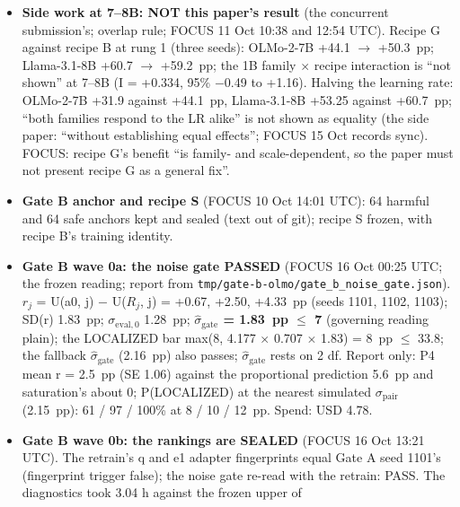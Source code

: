 \documentclass{article}
\theoremstyle{plain}
\theoremstyle{definition}
\theoremstyle{remark}
\begin{document}
\begin{itemize}
        the same sign and at least half the size, so ``harmful compliance as the
        HarmBench classifier defines it'' is allowed at 7--8B as at 1B. The same
        per-family pattern as at 1B (OLMo 1e-4, Llama 5e-5).
  \item \textbf{Side work at 7--8B: NOT this paper's result} (the concurrent
        submission's; overlap rule; FOCUS 11 Oct 10:38 and 12:54 UTC). Recipe G
        against recipe B at rung 1 (three seeds): OLMo-2-7B +44.1 $\to$
        +50.3~pp; Llama-3.1-8B +60.7 $\to$ +59.2~pp; the 1B family $\times$
        recipe interaction is ``not shown'' at 7--8B (I = +0.334, 95\% $-$0.49
        to +1.16). Halving the learning rate: OLMo-2-7B +31.9 against +44.1~pp,
        Llama-3.1-8B +53.25 against +60.7~pp; ``both families respond to the LR
        alike'' is not shown as equality (the side paper: ``without establishing
        equal effects''; FOCUS 15 Oct records sync). FOCUS: recipe G's benefit
        ``is family- and scale-dependent, so the paper must not present recipe G
        as a general fix''.
  \item \textbf{Gate B anchor and recipe S} (FOCUS 10 Oct 14:01 UTC): 64 harmful
        and 64 safe anchors kept and sealed (text out of git); recipe S frozen,
        with recipe B's training identity.
  \item \textbf{Gate B wave 0a: the noise gate PASSED} (FOCUS 16 Oct 00:25 UTC;
        the frozen reading; report from
        \nolinkurl{tmp/gate-b-olmo/gate_b_noise_gate.json}). $r_{j}$ = U(a0, j)
        $-$ U($R_{j}$, j) = +0.67, +2.50, +4.33~pp (seeds 1101, 1102, 1103);
        SD(r) 1.83~pp; $\sigma_{\mathrm{eval},0}$ 1.28~pp;
        \textbf{$\hat{\sigma}_{\mathrm{gate}}$ = 1.83~pp $\le$ 7} (governing
        reading plain); the LOCALIZED bar max(8, 4.177 $\times$ 0.707 $\times$
        1.83) = 8~pp $\le$ 33.8; the fallback $\hat{\sigma}_{\mathrm{gate}}$
        (2.16~pp) also passes; $\hat{\sigma}_{\mathrm{gate}}$ rests on 2 df.
        Report only: P4 mean r = 2.5~pp (SE 1.06) against the proportional
        prediction 5.6~pp and saturation's about 0; P(LOCALIZED) at the nearest
        simulated $\sigma_{\mathrm{pair}}$ (2.15~pp): 61 / 97 / 100\% at 8 / 10
        / 12~pp. Spend: USD 4.78.
  \item \textbf{Gate B wave 0b: the rankings are SEALED} (FOCUS 16 Oct 13:21
        UTC). The retrain's q and e1 adapter fingerprints equal Gate A seed
        1101's (fingerprint trigger false); the noise gate re-read with the
        retrain: PASS. The diagnostics took 3.04 h against the frozen upper of

\end{itemize}
\end{document}
